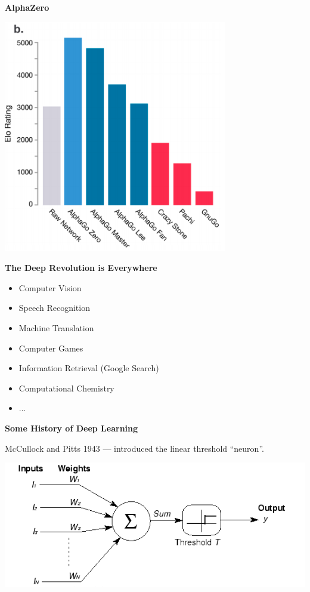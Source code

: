 \documentclass[landscape]{article}
\newcommand{\slide}[1]{\vfill
\eject
\centerline{\bf #1}
\vfill}
\begin{document}
{\slide{AlphaZero}


\vfill
\centerline{\includegraphics[height = 4in]{../images/alpha40}}

\slide{The Deep Revolution is Everywhere}

\begin{itemize}
\item Computer Vision
  \vfill
\item Speech Recognition
  \vfill
\item Machine Translation
  \vfill
\item Computer Games
  \vfill
\item Information Retrieval (Google Search)
  \vfill
\item Computational Chemistry
  \vfill
\item ...
\end{itemize}
  
\slide{Some History of Deep Learning}

McCullock and Pitts 1943 --- introduced the linear threshold ``neuron''.

\vfill
\centerline{\includegraphics[width = 6.0in]{../images/McCullock}}
\vfill

}
\end{document}
